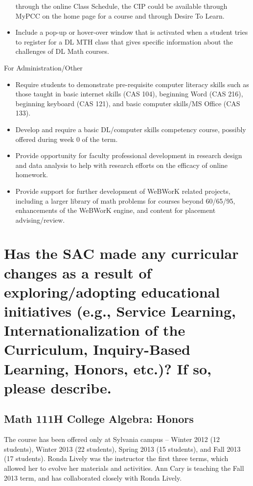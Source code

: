 \begin{description}
\begin{itemize}
  through the online Class Schedule, the CIP could be available through MyPCC on
  the home page for a course and through Desire To Learn.
\item Include a pop-up or hover-over window that is activated when a student
  tries to register for a DL MTH class that gives specific information about the
  challenges of DL Math courses.  
\end{itemize}
\item For Administration/Other
\begin{itemize}
\item Require students to demonstrate pre-requisite computer literacy skills
  such as those taught in basic internet skills (CAS 104), beginning Word (CAS
  216), beginning keyboard (CAS 121), and basic computer skills/MS Office (CAS
  133).
\item Develop and require a basic DL/computer skills competency course, possibly
  offered during week 0 of the term.  
\item Provide opportunity for faculty professional development in research
  design and data analysis to help with research efforts on the efficacy of
  online homework.
\item Provide support for further development of WeBWorK related projects,
  including a larger library of math problems for courses beyond 60/65/95,
  enhancements of the WeBWorK engine, and content for placement advising/review.
\end{itemize}
\end{description}

\section[Curricular changes resulting from educational initiatives]{Has the SAC
made any curricular changes as a result of exploring/adopting educational
initiatives (e.g., Service Learning, Internationalization of the Curriculum,
Inquiry-Based Learning, Honors, etc.)?  If so, please describe.}


\subsection{Math 111H College Algebra: Honors}\label{cur:sub:111H}

The course has been offered only at Sylvania campus -- Winter 2012 (12
students), Winter 2013 (22 students), Spring 2013 (15 students), and Fall 2013
(17 students).  Ronda Lively was the instructor the first three terms, which
allowed her to evolve her materials and activities.  Ann Cary is teaching the
Fall 2013 term, and has collaborated closely with Ronda Lively. 

